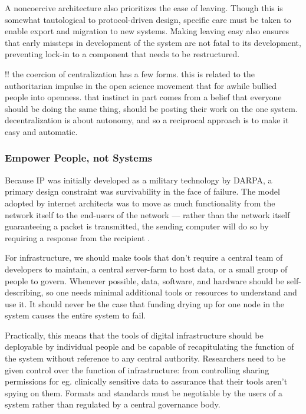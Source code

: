 \documentclass[10pt]{article}
\begin{document}
\begin{multicols}{2}
A noncoercive architecture also prioritizes the ease of leaving. Though
this is somewhat tautological to protocol-driven design, specific care
must be taken to enable export and migration to new systems. Making
leaving easy also ensures that early missteps in development of the
system are not fatal to its development, preventing lock-in to a
component that needs to be restructured.

!! the coercion of centralization has a few forms. this is related to
the authoritarian impulse in the open science movement that for awhile
bullied people into openness. that instinct in part comes from a belief
that everyone should be doing the same thing, should be posting their
work on the one system. decentralization is about autonomy, and so a
reciprocal approach is to make it easy and automatic.

\hypertarget{empower-people-not-systems}{%
\subsubsection{Empower People, not
Systems}\label{empower-people-not-systems}}

Because IP was initially developed as a military technology by DARPA, a
primary design constraint was survivability in the face of failure. The
model adopted by internet architects was to move as much functionality
from the network itself to the end-users of the network --- rather than
the network itself guaranteeing a packet is transmitted, the sending
computer will do so by requiring a response from the recipient \cite{clarkDesignPhilosophyDARPA1988} .

For infrastructure, we should make tools that don't require a central
team of developers to maintain, a central server-farm to host data, or a
small group of people to govern. Whenever possible, data, software, and
hardware should be self-describing, so one needs minimal additional
tools or resources to understand and use it. It should never be the case
that funding drying up for one node in the system causes the entire
system to fail.

Practically, this means that the tools of digital infrastructure should
be deployable by individual people and be capable of recapitulating the
function of the system without reference to any central authority.
Researchers need to be given control over the function of
infrastructure: from controlling sharing permissions for eg. clinically
sensitive data to assurance that their tools aren't spying on them.
Formats and standards must be negotiable by the users of a system rather
than regulated by a central governance body.


\end{multicols}
\end{document}
